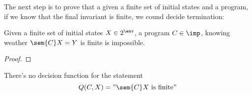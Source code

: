 The next step is to prove that a given a finite set of initial states
and a program, if we know that the final invariant is finite, we cound
decide termination:

\begin{lemma}
  Given a finite set of initial states \(X \in 2^\env\), a program
  \(C\in\imp\), knowing weather \(\sem{C}X = Y\) is finite is
  impossible.
\end{lemma}

\begin{proof}
  
\end{proof}

\begin{theorem}\label{th:finiteness}
  There's no decision function for the statement \[Q(C,X) = "\sem{C} X
  \text{ is finite}"\]
\end{theorem}
